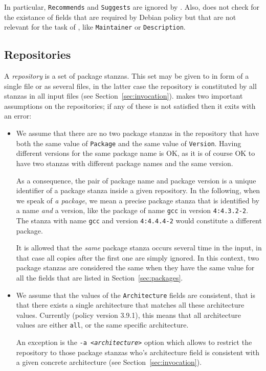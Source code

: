 In particular, \texttt{Recommends} and \texttt{Suggests} are ignored
by \debcheck. Also, \debcheck{} does not check for the existance of
fields that are required by Debian policy but that are not relevant
for the task of \debcheck, like \texttt{Maintainer} or
\texttt{Description}.

\subsection{Repositories}
\label{sec:repositories}
A \emph{repository} is a set of package stanzas. This set may be given
to \debcheck{} in form of a single file or as several files, in the
latter case the repository is constituted by all stanzas in all input
files (see Section~\ref{sec:invocation}). \debcheck{} makes two
important assumptions on the repositories; if any of these is not
satisfied then it exits with an error:

\begin{itemize}
\item
  We assume that there are no two package stanzas in the repository
  that have both the same value of \texttt{Package} and the same value
  of \texttt{Version}. Having different versions for the same package
  name is OK, as it is of course OK to have two stanzas with different
  package names and the same version.

  As a consequence, the pair of package name and package version is a
  unique identifier of a package stanza inside a given repository. In
  the following, when we speak of \emph{a package}, we mean a precise
  package stanza that is identified by a name \emph{and} a version,
  like the package of name \texttt{gcc} in version \texttt{4:4.3.2-2}.
  The stanza with name \texttt{gcc} and version \texttt{4:4.4.4-2}
  would constitute a different package.

  It is allowed that the \emph{same} package stanza occurs several
  time in the input, in that case all copies after the first one are
  simply ignored. In this context, two package stanzas are considered
  the same when they have the same value for all the fields that are
  listed in Section~\ref{sec:packages}.
\item
  We assume that the values of the \texttt{Architecture} fields are
  consistent, that is that there exists a single architecture that
  matches all these architecture values. Currently (policy version
  3.9.1), this means that all architecture values are either
  \texttt{all}, or the same specific architecture.

  An exception is the \texttt{-a \textit{<architecture>}} option which
  allows to restrict the repository to those package stanzas who's
  architecture field is consistent with a given concrete architecture
  (see Section~\ref{sec:invocation}).
\end{itemize}


